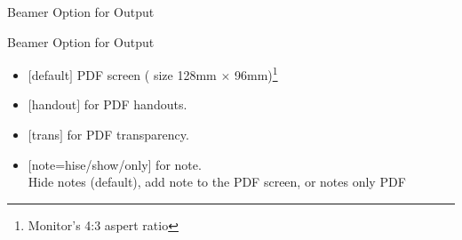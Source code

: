 \documentclass[10pt,blue,xcolor=pdftex,dvipsnames,table,handout]{beamer}
\begin{document}



		\begin{frame}[t]{Beamer Option for Output}

			\begin{block} {Beamer Option for Output}
			\begin{itemize}
			\item	$[$default$]$ PDF screen ( size 128mm $\times$ 96mm)\footnote{ Monitor's 4:3 aspert ratio}
			\item	$[$handout$]$ for PDF handouts.
			\item	$[$trans$]$ for PDF transparency.
			\item	$[$note=hise/show/only$]$ for note. \\Hide notes (default), add note to the PDF screen, or notes only PDF
			\end{itemize}
			\end{block}


		\end{frame}

















\end{document}
